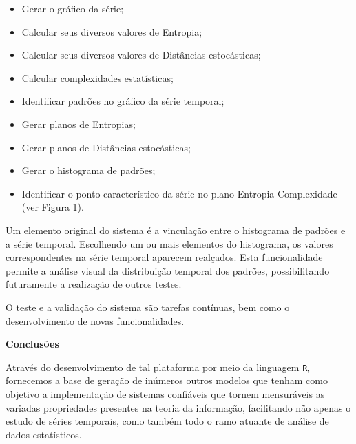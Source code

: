 \documentclass[12pt]{article}
\begin{document}
\begin{itemize}

	\item Gerar o gráfico da série;
	\item Calcular seus diversos valores de Entropia;
	\item Calcular seus diversos valores de Distâncias estocásticas;
	\item Calcular complexidades estatísticas;
    \item Identificar padrões no gráfico da série temporal;
    \item Gerar planos de Entropias;
    \item Gerar planos de Distâncias estocásticas;
	\item Gerar o histograma de padrões;
	\item Identificar o ponto característico da série no plano Entropia-Complexidade (ver Figura 1).

\end{itemize}

Um elemento original do sistema é a vinculação entre o histograma de padrões e a série temporal. Escolhendo um ou mais elementos do histograma, os valores correspondentes na série temporal aparecem realçados. Esta funcionalidade permite a análise visual da distribuição temporal dos padrões, possibilitando futuramente a realização de outros testes.
 
 O teste e a validação do sistema são tarefas contínuas, bem como o desenvolvimento de novas funcionalidades. 
 


\textbf{Conclusões}

	Através do desenvolvimento de tal plataforma por meio da linguagem \texttt R, fornecemos a base de geração de inúmeros outros modelos que tenham como objetivo a implementação de sistemas confiáveis que tornem mensuráveis as variadas propriedades presentes na teoria da informação, facilitando não apenas o estudo de séries temporais, como também todo o ramo atuante de análise de dados estatísticos.

 


\end{document}
